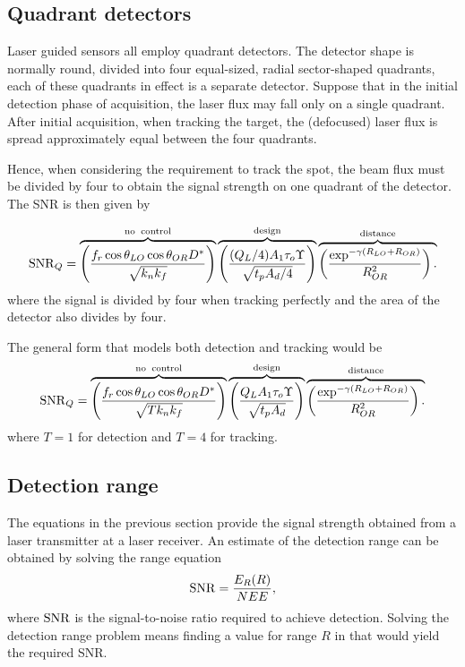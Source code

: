 \subsection{Quadrant detectors}
\noindent
Laser guided sensors all employ quadrant detectors.  The detector shape is normally round, divided into four equal-sized, radial sector-shaped quadrants, each of these quadrants in effect is a separate detector. Suppose that in the initial detection phase of acquisition, the laser flux may fall only on a single quadrant.  After initial acquisition, when tracking the target, the (defocused) laser flux is spread approximately equal between the four quadrants.

Hence, when considering the requirement to track the spot, the beam flux must be divided by four to obtain the signal strength on one quadrant of the detector. The SNR is then given by

\begin{equation}
\operatorname{SNR}_Q=
\overbrace{
\left(\frac{f_r  \cos\theta_{LO} \cos\theta_{OR} D^\ast }{\sqrt{k_nk_f}}\right)
}^{\rm no\;\;control}
\overbrace{
\left(\frac{(Q_L/4) A_1 \tau_o \Upsilon}{\sqrt{t_p A_d/4}}\right)
}^{\rm design}
\overbrace{
\left(\frac{\exp^{-\gamma (R_{LO}+R_{OR})} }{R^2_{OR}}\right).\\
}^{\rm distance}
\label{lrfd2f}
\end{equation}
where the signal is divided by four when tracking perfectly and the area of the detector also divides by four.


The general form that models both detection and tracking would be
\begin{equation}
\operatorname{SNR}_Q=
\overbrace{
\left(\frac{f_r  \cos\theta_{LO} \cos\theta_{OR} D^\ast }{\sqrt{T k_nk_f}}\right)
}^{\rm no\;\;control}
\overbrace{
\left(\frac{Q_L A_1 \tau_o \Upsilon}{\sqrt{t_p A_d}}\right)
}^{\rm design}
\overbrace{
\left(\frac{\exp^{-\gamma (R_{LO}+R_{OR})} }{R^2_{OR}}\right).\\
}^{\rm distance}
\label{lrfd2g}
\end{equation}
where $T=1$ for detection and $T=4$ for tracking.




\subsection{Detection range}
\noindent
The equations in the previous section provide the signal strength obtained from a laser transmitter at a laser receiver. An estimate of the detection range can be obtained by solving the range equation
\begin{equation}
\operatorname{SNR}=\frac{E_R(R)}{NEE},
\label{eq:laserdetectionsnrerror}
\end{equation}
where $\operatorname{SNR}$ is the signal-to-noise ratio required to achieve detection. Solving the detection range problem means finding a value for range $R$ in  that would yield the required SNR. 


